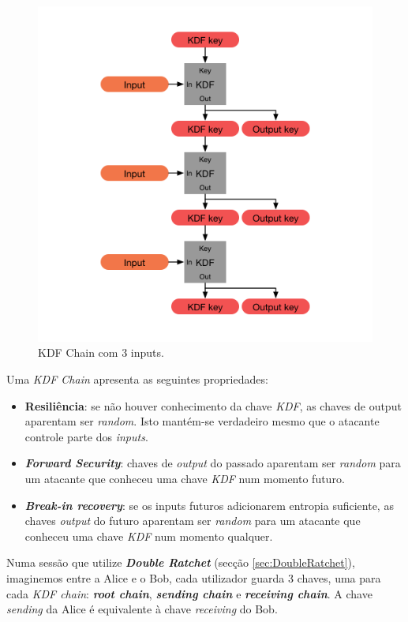 \begin{figure}[H]
\begin{center}
\includegraphics[width=12cm]{img/kdfChain.png}
\caption{KDF Chain com 3 inputs.}
\label{diagram:kdfChain}
\centering
\end{center}
\end{figure}

Uma \emph{KDF Chain} apresenta as seguintes propriedades:

\begin{itemize}
    \item \textbf{Resiliência}: se não houver conhecimento da chave \textit{KDF}, as chaves de output aparentam ser \emph{random}. Isto mantém-se verdadeiro mesmo que o atacante controle parte dos \emph{inputs}.
    \item \textbf{\textit{Forward Security}}: chaves de \textit{output} do passado aparentam ser \emph{random} para um atacante que conheceu uma chave \textit{KDF} num momento futuro.
    \item \textbf{\textit{Break-in recovery}}: se os inputs futuros adicionarem entropia suficiente, as chaves \textit{output} do futuro aparentam ser \emph{random} para um atacante que conheceu uma chave \textit{KDF} num momento qualquer.
\end{itemize}

Numa sessão que utilize \textbf{\textit{Double Ratchet}} (secção \ref{sec:DoubleRatchet}), imaginemos entre a Alice e o Bob, cada utilizador guarda 3 chaves, uma para cada \textit{KDF chain}: \textbf{\textit{root chain}}, \textbf{\textit{sending chain}} e \textbf{\textit{receiving chain}}. A chave \textit{sending} da Alice é equivalente à chave \textit{receiving} do Bob.

